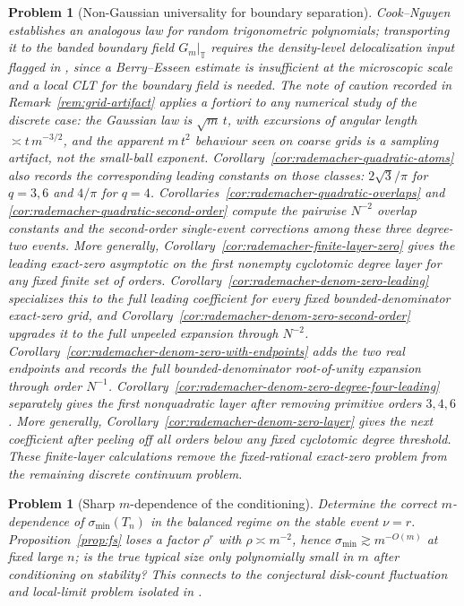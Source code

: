 \documentclass[11pt]{amsart}
\numberwithin{equation}{section}
\newtheorem{problem}[theorem]{Problem}
\theoremstyle{definition}
\theoremstyle{remark}
\newcommand{\T}{\mathbb T}
\newcommand{\smin}{\sigma_{\min}}
\begin{document}
\begin{problem}[Non-Gaussian universality for boundary separation]
Cook--Nguyen \cite{CookNguyen} establishes an analogous law for random trigonometric polynomials; transporting it to the banded boundary field $G_m|_\T$ requires the density-level delocalization input flagged in \cite[Rem.~6.3]{PhaseRetrieval}, since a Berry--Esseen estimate is insufficient at the microscopic scale and a local CLT for the boundary field is needed. The note of caution recorded in Remark~\ref{rem:grid-artifact} applies a fortiori to any numerical study of the discrete case: the Gaussian law is $\sqrt m\,t$, with excursions of angular length $\asymp t\,m^{-3/2}$, and the apparent \(m\,t^2\) behaviour seen on coarse grids is a sampling artifact, not the small-ball exponent.
Corollary~\ref{cor:rademacher-quadratic-atoms} also records the corresponding
leading constants on those classes: \(2\sqrt3/\pi\) for \(q=3,6\) and
\(4/\pi\) for \(q=4\).  Corollaries~\ref{cor:rademacher-quadratic-overlaps} and
\ref{cor:rademacher-quadratic-second-order} compute the pairwise \(N^{-2}\)
overlap constants and the second-order single-event corrections among these
three degree-two events.  More generally,
Corollary~\ref{cor:rademacher-finite-layer-zero} gives the leading exact-zero
asymptotic on the first nonempty cyclotomic degree layer for any fixed finite
set of orders.  Corollary~\ref{cor:rademacher-denom-zero-leading} specializes
this to the full leading coefficient for every fixed bounded-denominator
exact-zero grid, and Corollary~\ref{cor:rademacher-denom-zero-second-order}
upgrades it to the full unpeeled expansion through \(N^{-2}\).
Corollary~\ref{cor:rademacher-denom-zero-with-endpoints} adds the two real
endpoints and records the full bounded-denominator root-of-unity expansion
through order \(N^{-1}\).
Corollary~\ref{cor:rademacher-denom-zero-degree-four-leading} separately gives
the first nonquadratic layer after removing primitive orders \(3,4,6\).  More generally,
Corollary~\ref{cor:rademacher-denom-zero-layer} gives the next coefficient after
peeling off all orders below any fixed cyclotomic degree threshold.  These
finite-layer calculations remove the fixed-rational exact-zero problem from the
remaining discrete continuum problem.
\end{problem}

\begin{problem}[Sharp $m$-dependence of the conditioning]\label{prob:sharp-m}
Determine the correct $m$-dependence of $\smin(T_n)$ in the balanced regime on the stable event \(\nu=r\). Proposition~\ref{prop:fs} loses a factor $\rho^{r}$ with $\rho\asymp m^{-2}$, hence $\smin\gtrsim m^{-O(m)}$ at fixed large $n$; is the true typical size only polynomially small in $m$ after conditioning on stability? This connects to the conjectural disk-count fluctuation and local-limit problem isolated in \cite[Conj.~1.3]{Parity}.
\end{problem}
\end{document}
